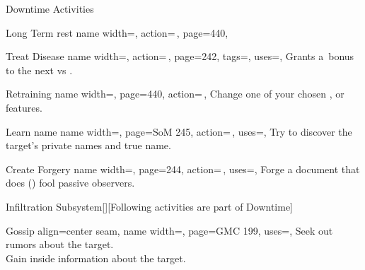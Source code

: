\begin{PageFrontLandscape}
\begin{TablesHalf}{\frontTableHeight}
\begin{Table}{Downtime Activities}
\begin{entry}{Long Term rest}{%
                name width=\activityLength,%
                action=\,,
                page=440,
            }
            \end{entry}
            \begin{entry}{Treat Disease}{%
                name width=\activityLength,%
                action=\,,
                page=242,
                tags=\Manipulate,
                uses={\Medicine[tags=T]},
            }
                Grants a \,\Cirm bonus to the next  vs . \hfill
            \end{entry}
            \begin{entry}{Retraining}{%
                name width=\activityLength,%
                page=440,
                action=\,,
            }
                Change one of your chosen ,  or  features.\hfill
            \end{entry}
            \begin{entry}{Learn name}{%
                name width=\activityLength,%
                page=SoM 245,
                action=\,,
                uses=\Rare \Se,
            }
                Try to discover the target's private names and true name.\hfill
            \end{entry}
            \begin{entry}{Create Forgery}{%
                name width=\activityLength,%
                page=244,
                action=\,,
                uses={\Society[tags={T,S}][val=20]},
            }
                Forge a document that does {()} fool passive observers. \hfill
            \end{entry}
        \end{Table}
        \vfill
        \begin{Table}{Infiltration Subsystem}[\;\dash\;][Following activities are part of Downtime]
            \begin{entry}{Gossip}{%
                align=center seam,
                name width=\activityLength,%
                page=GMC 199,
                uses={\Diplomacy[tags=S]},
            }
                Seek out rumors about the target. \hfill
                \\
                Gain inside information about the target. \hfill

\end{entry}
\end{Table}
\end{TablesHalf}
\end{PageFrontLandscape}
